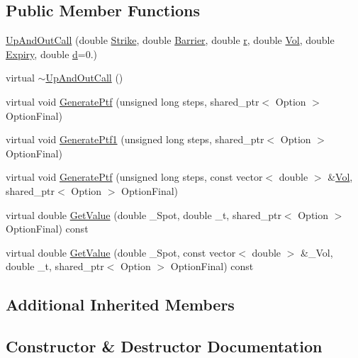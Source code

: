 \subsection*{Public Member Functions}
\begin{DoxyCompactItemize}
\item 
\hyperlink{classUpAndOutCall_a37f5a13ffa8dcda06ea3cbdbe0ed15e1}{Up\+And\+Out\+Call} (double \hyperlink{classOptionToReplicate_a64ffcbc25fc60c5dc18ca4b78194ca89}{Strike}, double \hyperlink{classOptionToReplicate_a7cd35379de855ad6e53008fbf7e9dda0}{Barrier}, double \hyperlink{classOptionToReplicate_ad344ef3a4a4e93372c390c60420d1a61}{r}, double \hyperlink{classOptionToReplicate_a3a28b1ab0cd1ee635b3c31998bd2c572}{Vol}, double \hyperlink{classOptionToReplicate_a62014eac88a2a766ed674be69e9fd926}{Expiry}, double \hyperlink{classOptionToReplicate_aa088a512c974dc622ca1bbca61ec5e34}{d}=0.)
\item 
virtual \hyperlink{classUpAndOutCall_a404ca86916e6ab0e614e58e72bd964b9}{$\sim$\+Up\+And\+Out\+Call} ()
\item 
virtual void \hyperlink{classUpAndOutCall_aed1268fa0b2bd83e9191385560bb7910}{Generate\+Ptf} (unsigned long steps, shared\+\_\+ptr$<$ Option $>$ Option\+Final)
\item 
virtual void \hyperlink{classUpAndOutCall_a2e25a8a717d611d6593fb9387e9d3b22}{Generate\+Ptf1} (unsigned long steps, shared\+\_\+ptr$<$ Option $>$ Option\+Final)
\item 
virtual void \hyperlink{classUpAndOutCall_a3afb135f946b6c42226c15a36a0b1971}{Generate\+Ptf} (unsigned long steps, const vector$<$ double $>$ \&\hyperlink{classOptionToReplicate_a3a28b1ab0cd1ee635b3c31998bd2c572}{Vol}, shared\+\_\+ptr$<$ Option $>$ Option\+Final)
\item 
virtual double \hyperlink{classUpAndOutCall_a472ab725d98145e17219dbc6106b7b5c}{Get\+Value} (double \+\_\+\+Spot, double \+\_\+t, shared\+\_\+ptr$<$ Option $>$ Option\+Final) const
\item 
virtual double \hyperlink{classUpAndOutCall_a6e3ed611443089f59d148e4f30428b0b}{Get\+Value} (double \+\_\+\+Spot, const vector$<$ double $>$ \&\+\_\+\+Vol, double \+\_\+t, shared\+\_\+ptr$<$ Option $>$ Option\+Final) const
\end{DoxyCompactItemize}
\subsection*{Additional Inherited Members}


\subsection{Constructor \& Destructor Documentation}
\hypertarget{classUpAndOutCall_a37f5a13ffa8dcda06ea3cbdbe0ed15e1}{}\label{classUpAndOutCall_a37f5a13ffa8dcda06ea3cbdbe0ed15e1} 
